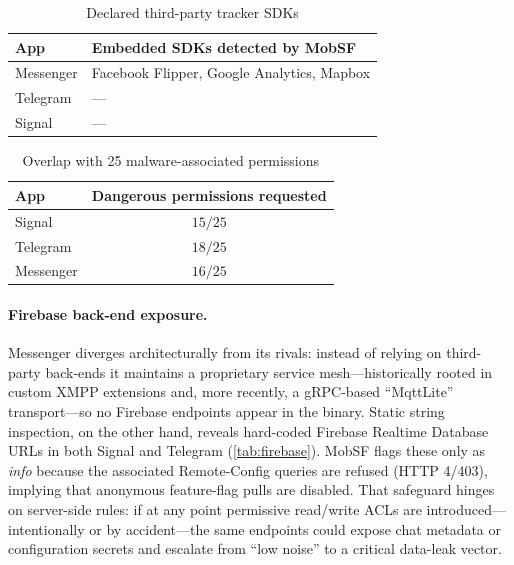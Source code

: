 \documentclass[a4paper,12pt]{report}
\begin{document}
\begin{table}[htbp]
  \centering
  \caption{Declared third-party tracker SDKs}
  \label{tab:trackers}
  \begin{tabular}{|l|p{7cm}|}
    \hline
    \textbf{App} & \textbf{Embedded SDKs detected by MobSF} \\ \hline
    Messenger & Facebook Flipper, Google Analytics, Mapbox \\ \hline
    Telegram  & — \\ \hline
    Signal    & — \\ \hline
  \end{tabular}
\end{table}

\begin{table}[htbp]
  \centering
  \caption{Overlap with 25 malware-associated permissions}
  \label{tab:perm-malware}
  \begin{tabular}{|l|c|}
    \hline
    \textbf{App} & \textbf{Dangerous permissions requested} \\ \hline
    Signal    & \(15 / 25\) \\ \hline
    Telegram  & \(18 / 25\) \\ \hline
    Messenger & \(16 / 25\) \\ \hline
  \end{tabular}
\end{table}

\paragraph{Firebase back-end exposure.}

Messenger diverges architecturally from its rivals: instead of relying on third-party back-ends it maintains a proprietary service mesh—historically rooted in custom XMPP extensions and, more recently, a gRPC-based “MqttLite” transport—so no Firebase endpoints appear in the binary.
Static string inspection, on the other hand, reveals hard-coded Firebase Realtime Database URLs in both Signal and Telegram (\autoref{tab:firebase}). MobSF flags these only as \textit{info} because the associated Remote-Config queries are refused (HTTP 4/403), implying that anonymous feature-flag pulls are disabled. That safeguard hinges on server-side rules: if at any point permissive read/write ACLs are introduced—intentionally or by accident—the same endpoints could expose chat metadata or configuration secrets and escalate from “low noise” to a critical data-leak vector.
\end{document}

